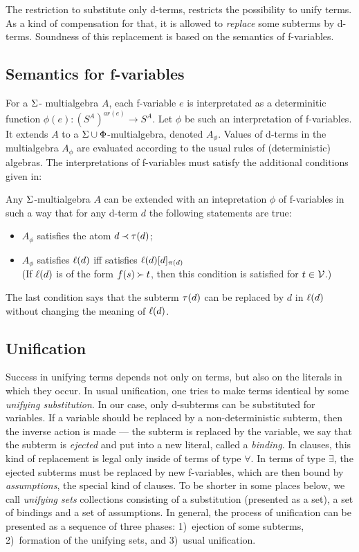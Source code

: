 The restriction to substitute only d-terms, restricts the possibility to
unify terms. As a kind of compensation for that, it  
 is allowed to {\em replace} some subterms by d-terms.
Soundness of this replacement
is based on the semantics of f-variables.

\subsection{Semantics for f-variables}

For a  \(\Sigma\)- multialgebra $A$, each f-variable $e$ is
interpretated as a determinitic function \(\phi(e): (S^A)^{ar(e)}\to S^A\).
Let $\phi$ be such an interpretation of f-variables. It
extends  $A$ to a \(\Sigma\cup\Phi\)-multialgebra, denoted
 \(A_\phi\).  Values of d-terms in the multialgebra \(A_\phi\) are
evaluated according to the usual rules of (deterministic) algebras.  
The interpretations of f-variables must satisfy the additional conditions
given in:

\begin{lemma}\label{le:f-variables}
Any \(\Sigma\)-multialgebra $A$ can be extended with an intepretation $\phi$
of f-variables in such a way that for any d-term $d$ the following statements
are true:
\begin{itemize}\smallerspaces
\item $A_\phi$ satisfies the atom \(d\mathbin{\prec} \tau(d)\);
\item $A_\phi$ satisfies \(\ell(d)\) iff satisfies \(\ell(d) [d]_{\pi(d)}\) \\
(If \(\ell(d)\) is of the form $f(s)\mathbin{\succ} t$, then this condition is satisfied
for $t\in{\cal V}$.)
\vspace{-2ex}
\end{itemize}
\end{lemma}
The last condition says that the subterm \(\tau(d)\) can be replaced by $d$ in
\(\ell(d)\) without changing the meaning of \(\ell(d)\). 

\subsection{Unification}

Success in unifying terms depends not only on terms, but also on the literals in which
they occur.  In usual unification, one tries to make terms identical by
some {\em unifying substitution}.  In our case, only d-subterms can be substituted
for variables.  If a variable  should be replaced by a
non-deterministic subterm, then the inverse action is made --- the subterm is
replaced by the variable, we say that the subterm is {\em ejected} and put
into a new literal, called a {\em binding}.  In clauses, this kind of
replacement is legal only inside of terms of type $\forall$.  In terms of
type $\exists$, the ejected subterms must be replaced by new f-variables,
which are then bound by {\em assumptions}, the special kind of clauses.  To
be shorter in some places below, we call {\em unifying sets} collections
consisting of a substitution (presented as a set), a set of bindings and a
set of assumptions.  In general, the process of unification can be presented
as a sequence of three phases: 1)~ejection of some subterms, 2)~formation of
the unifying sets, and 3)~usual unification.


